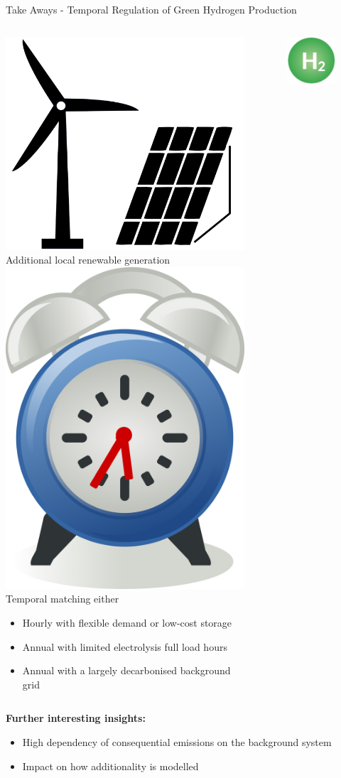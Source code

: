 \begin{frame}{Take Aways - Temporal Regulation of Green Hydrogen Production}
	\begin{tcolorbox}[colback=white!5,colframe=white!60!black,title=\textbf{Green hydrogen certification: Low emissions \& low costs require}]
		\begin{columns}[t]
			\begin{column}{0.7\textwidth}
				\includegraphics[width=0.09\linewidth]{images/res} Additional local renewable generation  \\
				\vspace{0.2cm}
				\includegraphics[trim={0 0.5cm 0 0}, clip, width=0.05\linewidth]{images/clock} Temporal matching either
				\begin{itemize}
					\item Hourly with flexible demand or low-cost storage
					\item Annual with limited electrolysis full load hours
					\item Annual with a largely decarbonised background grid
				\end{itemize}
			\end{column}
			\begin{column}{0.3\textwidth}
				\begin{figure}
					\vspace{-0.5 cm}
					\centering
					\includegraphics[width=0.5\linewidth]{images/greenh2}
				\end{figure}
				
			\end{column}
		\end{columns}
	\end{tcolorbox}
	\textbf{Further interesting insights:}
	\begin{itemize}
		\item High dependency of consequential emissions on the background system
		\item Impact on how additionality is modelled
	\end{itemize}
\end{frame}


